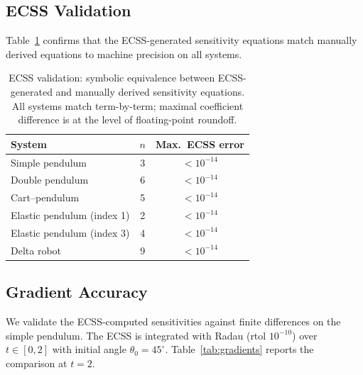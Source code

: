 \documentclass[12pt,a4paper]{article}
\theoremstyle{definition}
\theoremstyle{plain}
\begin{document}
\subsection{ECSS Validation}

Table~\ref{tab:ecss_validation} confirms that the ECSS-generated sensitivity equations match manually derived equations to machine precision on all systems.

\begin{table}[htbp]
  \centering
  \caption{ECSS validation: symbolic equivalence between ECSS-generated and manually derived sensitivity equations. All systems match term-by-term; maximal coefficient difference is at the level of floating-point roundoff.}
  \label{tab:ecss_validation}
  \begin{tabular}{lcc}
    \toprule
    System & $n$ & Max.\ ECSS error \\
    \midrule
    Simple pendulum & 3 & $< 10^{-14}$ \\
    Double pendulum & 6 & $< 10^{-14}$ \\
    Cart--pendulum & 5 & $< 10^{-14}$ \\
    Elastic pendulum (index 1) & 2 & $< 10^{-14}$ \\
    Elastic pendulum (index 3) & 4 & $< 10^{-14}$ \\
    Delta robot & 9 & $< 10^{-14}$ \\
    \bottomrule
  \end{tabular}
\end{table}

\subsection{Gradient Accuracy}

We validate the ECSS-computed sensitivities against finite differences on the simple pendulum. The ECSS is integrated with Radau (rtol $10^{-10}$) over $t \in [0,2]$ with initial angle $\theta_0 = 45^\circ$. Table~\ref{tab:gradients} reports the comparison at $t=2$.
\end{document}
